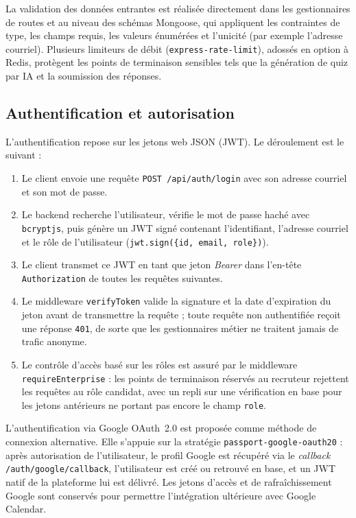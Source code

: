 La validation des données entrantes est réalisée directement dans les gestionnaires de routes
et au niveau des schémas Mongoose, qui appliquent les contraintes de type, les champs requis,
les valeurs énumérées et l'unicité (par exemple l'adresse courriel). Plusieurs limiteurs de
débit (\texttt{express-rate-limit}), adossés en option à Redis, protègent les points de
terminaison sensibles tels que la génération de quiz par IA et la soumission des réponses.

\subsection{Authentification et autorisation}

L'authentification repose sur les jetons web JSON (JWT). Le déroulement est le suivant :

\begin{enumerate}
  \item Le client envoie une requête \texttt{POST /api/auth/login} avec son adresse courriel
        et son mot de passe.
  \item Le backend recherche l'utilisateur, vérifie le mot de passe haché avec
        \texttt{bcryptjs}, puis génère un JWT signé contenant l'identifiant, l'adresse courriel
        et le rôle de l'utilisateur (\texttt{jwt.sign(\{id, email, role\})}).
  \item Le client transmet ce JWT en tant que jeton \textit{Bearer} dans l'en-tête
        \texttt{Authorization} de toutes les requêtes suivantes.
  \item Le middleware \texttt{verifyToken} valide la signature et la date d'expiration du
        jeton avant de transmettre la requête ; toute requête non authentifiée reçoit une
        réponse \texttt{401}, de sorte que les gestionnaires métier ne traitent jamais de
        trafic anonyme.
  \item Le contrôle d'accès basé sur les rôles est assuré par le middleware
        \texttt{requireEnterprise} : les points de terminaison réservés au recruteur rejettent
        les requêtes au rôle candidat, avec un repli sur une vérification en base pour les
        jetons antérieurs ne portant pas encore le champ \texttt{role}.
\end{enumerate}

L'authentification via Google OAuth~2.0 est proposée comme méthode de connexion alternative.
Elle s'appuie sur la stratégie \texttt{passport-google-oauth20} : après autorisation de
l'utilisateur, le profil Google est récupéré via le \textit{callback}
\texttt{/auth/google/callback}, l'utilisateur est créé ou retrouvé en base, et un JWT
natif de la plateforme lui est délivré. Les jetons d'accès et de rafraîchissement Google sont
conservés pour permettre l'intégration ultérieure avec Google Calendar.


